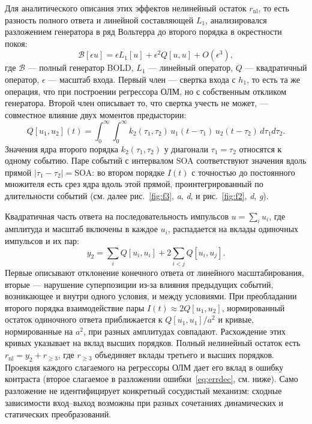 Для аналитического описания этих эффектов нелинейный остаток $r_{\mathrm{nl}}$, то есть разность полного ответа и линейной составляющей $L_1$, анализировался разложением генератора в ряд Вольтерра до второго порядка в окрестности покоя:
\begin{equation}\label{eq:volterra}
\mathcal B[\epsilon u]
=\epsilon L_1[u]+\epsilon^2Q[u,u]+O(\epsilon^3),
\end{equation}
где $\mathcal B$ --- полный генератор BOLD, $L_1$ --- линейный оператор, $Q$ --- квадратичный оператор, $\epsilon$ --- масштаб входа. Первый член --- свертка входа с $h_1$, то есть та же операция, что при построении регрессора ОЛМ, но с собственным откликом генератора. Второй член описывает то, что свертка учесть не может, --- совместное влияние двух моментов предыстории:
\begin{equation}\label{eq:Q}
Q[u_1,u_2](t)=\int_0^\infty\int_0^\infty k_2(\tau_1,\tau_2)\,u_1(t-\tau_1)\,u_2(t-\tau_2)\,d\tau_1d\tau_2.
\end{equation}
Значения ядра второго порядка $k_2(\tau_1,\tau_2)$ у диагонали $\tau_1=\tau_2$ относятся к одному событию. Паре событий с интервалом SOA соответствуют значения вдоль прямой $|\tau_1-\tau_2|=\mathrm{SOA}$: во втором порядке $I(t)$ с точностью до постоянного множителя есть срез ядра вдоль этой прямой, проинтегрированный по длительности событий (см. далее рис.~\ref{fig:f3}, \textit{a}, \textit{d}, и рис.~\ref{fig:f2}, \textit{d}, \textit{g}).

Квадратичная часть ответа на последовательность импульсов $u=\sum_i u_i$, где амплитуда и масштаб включены в каждое $u_i$, распадается на вклады одиночных импульсов и их пар:
\begin{equation}\label{eq:y2}
y_2=\sum_i Q[u_i,u_i]+2\sum_{i<j}Q[u_i,u_j].
\end{equation}
Первые описывают отклонение конечного ответа от линейного масштабирования, вторые --- нарушение суперпозиции из-за влияния предыдущих событий, возникающее и внутри одного условия, и между условиями. При преобладании второго порядка взаимодействие пары $I(t)\approx2Q[u_1,u_2]$, нормированный остаток одиночного ответа приближается к $Q[u_1,u_1]/a^2$ и кривые, нормированные на $a^2$, при разных амплитудах совпадают. Расхождение этих кривых указывает на вклад высших порядков. Полный нелинейный остаток есть $r_{\mathrm{nl}}=y_2+r_{\ge3}$, где $r_{\ge3}$ объединяет вклады третьего и высших порядков. Проекция каждого слагаемого на регрессоры ОЛМ дает его вклад в ошибку контраста (второе слагаемое в разложении ошибки~\eqref{eq:errdec}, см. ниже). Само разложение не идентифицирует конкретный сосудистый механизм: сходные зависимости вход--выход возможны при разных сочетаниях динамических и статических преобразований.


